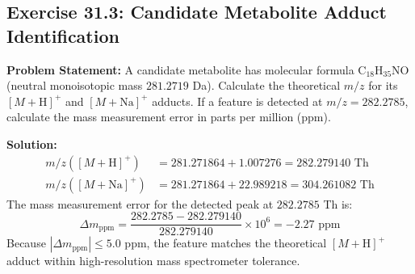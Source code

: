 \documentclass[11pt,twoside,openright]{book}
\begin{document}
\subsection*{Exercise 31.3: Candidate Metabolite Adduct Identification}
\noindent\textbf{Problem Statement:}\enspace
A candidate metabolite has molecular formula $\text{C}_{18}\text{H}_{35}\text{NO}$ (neutral monoisotopic mass $281.2719$ Da). Calculate the theoretical $m/z$ for its $[M+\text{H}]^+$ and $[M+\text{Na}]^+$ adducts. If a feature is detected at $m/z = 282.2785$, calculate the mass measurement error in parts per million (ppm).

\noindent\textbf{Solution:}\enspace
\begin{align}
m/z([M+\text{H}]^+) &= 281.271864 + 1.007276 = 282.279140 \text{ Th} \\
m/z([M+\text{Na}]^+) &= 281.271864 + 22.989218 = 304.261082 \text{ Th}
\end{align}
The mass measurement error for the detected peak at $282.2785$ Th is:
\begin{equation}
\Delta m_{\text{ppm}} = \frac{282.2785 - 282.279140}{282.279140} \times 10^6 = -2.27 \text{ ppm}
\end{equation}
Because $|\Delta m_{\text{ppm}}| \le 5.0$ ppm, the feature matches the theoretical $[M+\text{H}]^+$ adduct within high-resolution mass spectrometer tolerance.
\end{document}
